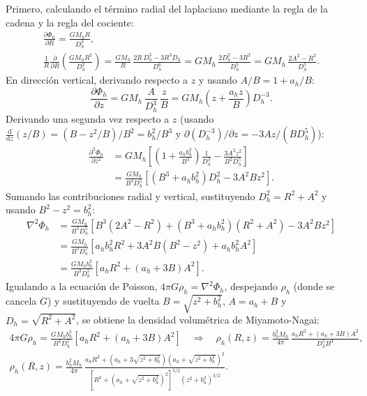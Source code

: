 \documentclass[11pt,letterpaper]{article}
\begin{document}
Primero, calculando el término radial del laplaciano mediante la regla de la cadena y la regla del cociente:
\begin{gather}
    \frac{\partial \Phi_h}{\partial R} = \frac{G M_h R}{D_h^3}, \nonumber \\[3pt]
    \frac{1}{R}\frac{\partial}{\partial R}\!\left(\frac{G M_h R^2}{D_h^3}\right)
    = \frac{G M_h}{R}\,\frac{2R\,D_h^3 - 3R^3 D_h}{D_h^6}
    = G M_h\,\frac{2D_h^2 - 3R^2}{D_h^5}
    = G M_h\,\frac{2A^2 - R^2}{D_h^5}.
\end{gather}
En dirección vertical, derivando respecto a $z$ y usando $A/B = 1 + a_h/B$:
\begin{equation}
    \frac{\partial \Phi_h}{\partial z}
    = G M_h\,\frac{A}{D_h^3}\,\frac{z}{B}
    = G M_h\left(z + \frac{a_h z}{B}\right)D_h^{-3}.
\end{equation}
Derivando una segunda vez respecto a $z$ (usando $\frac{\mathrm{d}}{\mathrm{d}z}(z/B) = (B - z^2/B)/B^2 = b_h^2/B^3$ y $\partial(D_h^{-3})/\partial z = -3 A z/(B D_h^5)$):
\begin{align}
    \frac{\partial^2 \Phi_h}{\partial z^2}
    &= G M_h\left[\left(1 + \frac{a_h b_h^2}{B^3}\right)\frac{1}{D_h^3}
    - \frac{3 A^2 z^2}{B^2 D_h^5}\right] \nonumber \\
    &= \frac{G M_h}{B^3 D_h^5}\left[(B^3 + a_h b_h^2)D_h^2 - 3 A^2 B z^2\right].
\end{align}
Sumando las contribuciones radial y vertical, sustituyendo $D_h^2 = R^2 + A^2$ y usando $B^2 - z^2 = b_h^2$:
\begin{align}
    \nabla^2\Phi_h
    &= \frac{G M_h}{B^3 D_h^5}\left[B^3(2A^2 - R^2) + (B^3 + a_h b_h^2)(R^2 + A^2) - 3 A^2 B z^2\right] \nonumber \\
    &= \frac{G M_h}{B^3 D_h^5}\left[a_h b_h^2 R^2 + 3 A^2 B(B^2 - z^2) + a_h b_h^2 A^2\right] \nonumber \\
    &= \frac{G M_h b_h^2}{B^3 D_h^5}\left[a_h R^2 + (a_h + 3B)A^2\right].
\end{align}
Igualando a la ecuación de Poisson, $4\pi G\rho_h = \nabla^2\Phi_h$, despejando $\rho_h$ (donde se cancela $G$) y sustituyendo de vuelta $B = \sqrt{z^2 + b_h^2}$, $A = a_h + B$ y $D_h = \sqrt{R^2 + A^2}$, se obtiene la densidad volumétrica de Miyamoto-Nagai:
\begin{gather}
    4\pi G\rho_h = \frac{G M_h b_h^2}{B^3 D_h^5}\left[a_h R^2 + (a_h + 3B)A^2\right]
    \quad \Longrightarrow \quad
    \rho_h(R, z) = \frac{b_h^2 M_h}{4\pi}\,\frac{a_h R^2 + (a_h + 3B)A^2}{D_h^5 B^3}, \nonumber \\[6pt]
    \boxed{\rho_h(R, z) = \frac{b_h^2 M_h}{4\pi}\,
    \frac{a_h R^2 + \left(a_h + 3\sqrt{z^2 + b_h^2}\right)\left(a_h + \sqrt{z^2 + b_h^2}\right)^2}
         {\left[R^2 + \left(a_h + \sqrt{z^2 + b_h^2}\right)^2\right]^{5/2} (z^2 + b_h^2)^{3/2}}}.
    \label{eq:rho_mn}
\end{gather}
\end{document}
